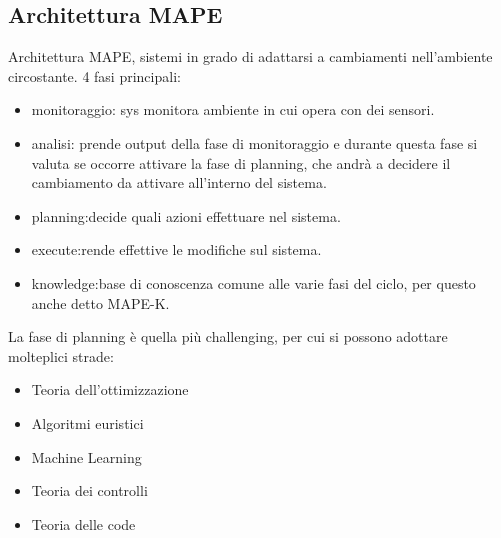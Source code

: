 \documentclass{article}
\begin{document}
\subsection{Architettura MAPE}
Architettura MAPE, sistemi in grado di adattarsi a cambiamenti nell'ambiente circostante. 4 fasi principali:\\
\begin{itemize}
\item monitoraggio: sys monitora ambiente in cui opera con dei sensori.
\item analisi: prende output della fase di monitoraggio e durante questa fase si valuta se occorre attivare la fase di planning, che andrà a decidere il cambiamento da attivare all'interno del sistema.
\item planning:decide quali azioni effettuare nel sistema.
\item execute:rende effettive le modifiche sul sistema.
\item knowledge:base di conoscenza comune alle varie fasi del ciclo, per questo anche detto MAPE-K.
\end{itemize}
La fase di planning è quella più challenging, per cui si possono adottare molteplici strade:
\begin{itemize}
\item Teoria dell'ottimizzazione
\item Algoritmi euristici
\item Machine Learning
\item Teoria dei controlli
\item Teoria delle code
\end{itemize} 
\end{document}
